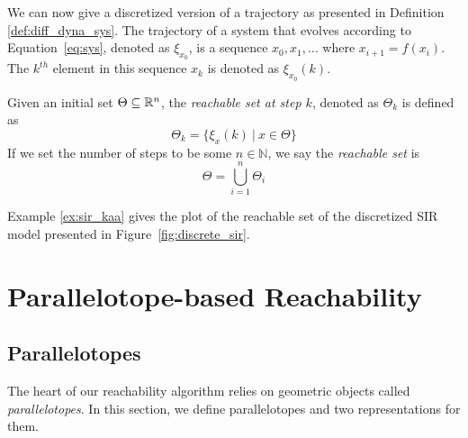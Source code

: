 We can now give a discretized version of a trajectory as presented in Definition \ref{def:diff_dyna_sys}. The trajectory of a system that evolves according to Equation~\ref{eq:sys}, denoted as $\xi_{x_0}$, is a sequence $x_0, x_1, \ldots $ where $x_{i+1} = f(x_i)$.
%
The $k^{th}$ element in this sequence $x_k$ is denoted as $\xi_{x_0}(k)$.

\begin{definition}
Given an initial set $\Theta \subseteq {\mathbb{R}}^n$, the \emph{reachable set at step $k$}, denoted as $\Theta_k$ is defined as
\begin{equation}
  \Theta_k = \{ \xi_x(k)\: | \: x \in \Theta\}
\label{eq:reachset}
\end{equation}
If we set the number of steps to be some $n \in \mathbb{N}$, we say the \emph{reachable set} is
\begin{equation}
  \Theta = \bigcup_{i=1}^n \Theta_i
\end{equation}
\end{definition}
%
\noindent Example \ref{ex:sir_kaa} gives the plot of the reachable set of the discretized SIR model presented in Figure~\ref{fig:discrete_sir}.

\section{Parallelotope-based Reachability}
\subsection{Parallelotopes}
\label{sec:parallelotope}
%
The heart of our reachability algorithm relies on geometric objects called \emph{parallelotopes}. In this section, we define parallelotopes and two representations for them.

